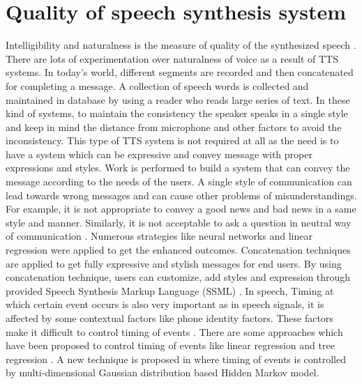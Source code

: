 \section{Quality of speech synthesis system}
Intelligibility and naturalness is the measure of quality of the synthesized speech \cite{swetha2013text}. There are lots of experimentation over naturalness of voice as a result of TTS systems. In today’s world, different segments are recorded and then concatenated for completing a message. A collection of speech words is collected and maintained in database by using a reader who reads large series of text. In these kind of systems, to maintain the consistency the speaker speaks in a single style and keep in mind the distance from microphone and other factors to avoid the inconsistency. This type of TTS system is not required at all as the need is to have a system which can be expressive and convey message with proper expressions and styles. Work is performed to build a system that can convey the message according to the needs of the users. A single style of communication can lead towards wrong messages and can cause other problems of misunderstandings. For example, it is not appropriate to convey a good news and bad news in a same style and manner. Similarly, it is not acceptable to ask a question in neutral way of communication \cite{eide2004corpus}. Numerous strategies like neural networks and linear regression were applied to get the enhanced outcomes. Concatenation techniques are applied to get fully expressive and stylish messages for end users. By using concatenation technique, users can customize, add styles and expression through provided Speech Synthesis Markup Language (SSML) \cite{eide2004corpus}. In speech, Timing at which certain event occurs is also very important as in speech signals, it is affected by some contextual factors like phone identity factors. These factors make it difficult to control timing of events \cite{tokuda2000speech}. There are some approaches which have been proposed to control timing of events like linear regression \cite{kaiki1992linguistic} and tree regression \cite{riley1992tree}. A new technique is proposed in \cite{tokuda2000speech} where timing of events is controlled by multi-dimensional Gaussian distribution based Hidden Markov model.

